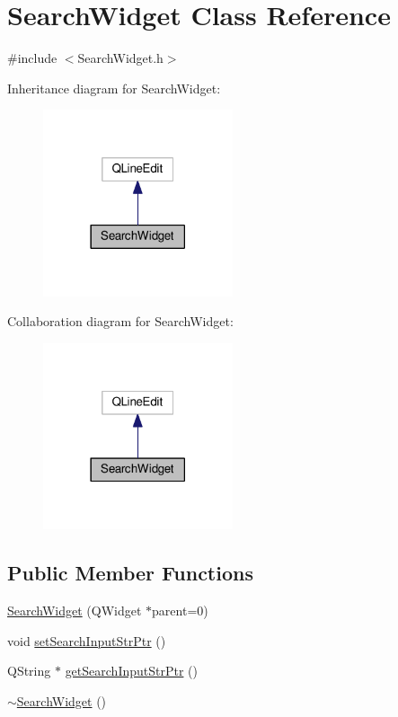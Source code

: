 \hypertarget{class_search_widget}{\section{Search\-Widget Class Reference}
\label{class_search_widget}
}


{\ttfamily \#include $<$Search\-Widget.\-h$>$}



Inheritance diagram for Search\-Widget\-:
\nopagebreak
\begin{figure}[H]
\begin{center}
\leavevmode
\includegraphics[width=158pt]{class_search_widget__inherit__graph}
\end{center}
\end{figure}


Collaboration diagram for Search\-Widget\-:
\nopagebreak
\begin{figure}[H]
\begin{center}
\leavevmode
\includegraphics[width=158pt]{class_search_widget__coll__graph}
\end{center}
\end{figure}
\subsection*{Public Member Functions}
\begin{DoxyCompactItemize}
\item 
\hyperlink{class_search_widget_a5e9a6618a556149d58db62bb11514ff9}{Search\-Widget} (Q\-Widget $\ast$parent=0)
\item 
void \hyperlink{class_search_widget_a8f8b5f30cb03b79d6da02720a59fbd2b}{set\-Search\-Input\-Str\-Ptr} ()
\item 
Q\-String $\ast$ \hyperlink{class_search_widget_a6d832f61ea54365b2341ba6d9226c3ee}{get\-Search\-Input\-Str\-Ptr} ()
\item 
\hyperlink{class_search_widget_a100ce22cd6ec4e52381851f0154dbe99}{$\sim$\-Search\-Widget} ()
\end{DoxyCompactItemize}
